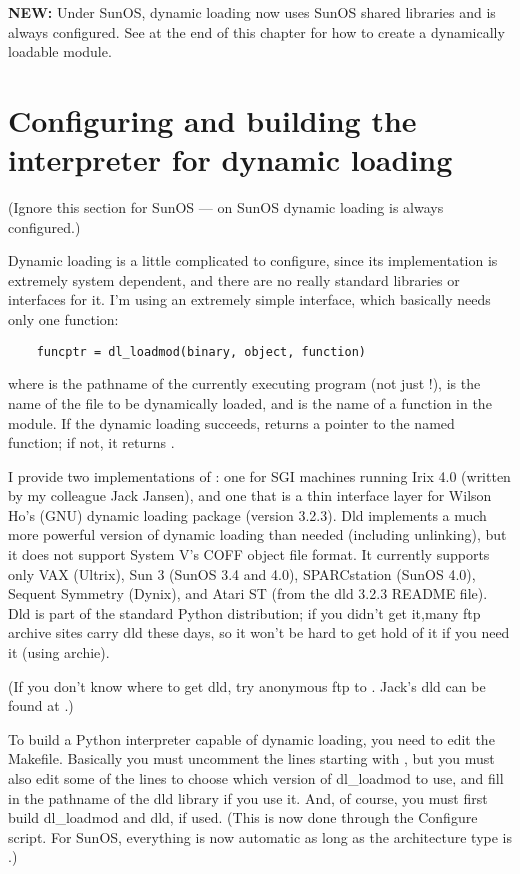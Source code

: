 {\bf NEW:} Under SunOS, dynamic loading now uses SunOS shared
libraries and is always configured.  See at the end of this chapter
for how to create a dynamically loadable module.


\section{Configuring and building the interpreter for dynamic loading}

(Ignore this section for SunOS --- on SunOS dynamic loading is always
configured.)

Dynamic loading is a little complicated to configure, since its
implementation is extremely system dependent, and there are no
really standard libraries or interfaces for it.  I'm using an
extremely simple interface, which basically needs only one function:

\begin{verbatim}
    funcptr = dl_loadmod(binary, object, function)
\end{verbatim}

where  is the pathname of the currently executing program
(not just !),  is the name of the 
file to be dynamically loaded, and  is the name of a
function in the module.  If the dynamic loading succeeds,
 returns a pointer to the named function; if not, it
returns .

I provide two implementations of : one for SGI machines
running Irix 4.0 (written by my colleague Jack Jansen), and one that
is a thin interface layer for Wilson Ho's (GNU) dynamic loading
package  (version 3.2.3).  Dld implements a much more powerful
version of dynamic loading than needed (including unlinking), but it
does not support System V's COFF object file format.  It currently
supports only VAX (Ultrix), Sun 3 (SunOS 3.4 and 4.0), SPARCstation
(SunOS 4.0), Sequent Symmetry (Dynix), and Atari ST (from the dld
3.2.3 README file).  Dld is part of the standard Python distribution;
if you didn't get it,many ftp archive sites carry dld these days, so
it won't be hard to get hold of it if you need it (using archie).

(If you don't know where to get dld, try anonymous ftp to
.  Jack's dld
can be found at .)

To build a Python interpreter capable of dynamic loading, you need to
edit the Makefile.  Basically you must uncomment the lines starting
with , but you must also edit some of the lines to choose
which version of dl_loadmod to use, and fill in the pathname of the dld
library if you use it.  And, of course, you must first build
dl_loadmod and dld, if used.  (This is now done through the Configure
script.  For SunOS, everything is now automatic as long as the
architecture type is .)


